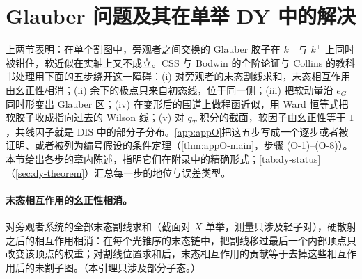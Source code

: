 \section{Glauber 问题及其在单举 DY 中的解决}\label{sec:dy-glauber}

上两节表明：在单个割图中，旁观者之间交换的 Glauber 胶子在 $k^-$ 与 $k^+$ 上同时被钳住，软近似在实轴上又不成立。CSS 与 Bodwin 的全阶论证\cite{CollinsSoperSterman1985b,CollinsSoperSterman1988,Bodwin1985}与 Collins 的教科书处理\cite[第~14.4~节]{Collins2011}用下面的五步绕开这一障碍：(i) 对旁观者的末态割线求和，末态相互作用由幺正性相消；(ii) 余下的极点只来自初态线，位于同一侧；(iii) 把软动量沿 $e_G$ 同时形变出 Glauber 区；(iv) 在变形后的围道上做程函近似，用 Ward 恒等式把软胶子收成指向过去的 Wilson 线；(v) 对 $q_T$ 积分的截面，软因子由幺正性等于 $1$，共线因子就是 DIS 中的部分子分布。\cref{app:appO}把这五步写成一个逐步或者被证明、或者被列为编号假设的条件定理（\cref{thm:appO-main}，步骤 (O-1)--(O-8)）。本节给出各步的章内陈述，指明它们在附录中的精确形式；\cref{tab:dy-status}（\cref{sec:dy-theorem}）汇总每一步的地位与误差类型。

\paragraph{末态相互作用的幺正性相消。}

\begin{lemma}\label{lem:dy-fsi}
对旁观者系统的全部末态割线求和（截面对 $X$ 单举，测量只涉及轻子对），硬散射之后的相互作用相消：在每个光锥序的末态链中，把割线移过最后一个内部顶点只改变该顶点的权重；对割线位置求和后，末态相互作用的贡献等于去掉这些相互作用后的未割子图。（本引理只涉及部分子态。）
\end{lemma}

